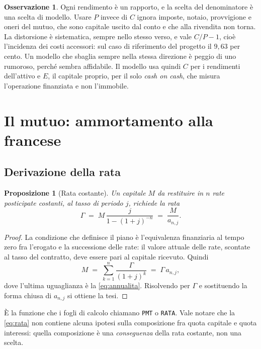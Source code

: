 \documentclass[11pt,a4paper]{article}
\theoremstyle{definition}
\newtheorem{osservazione}[definizione]{Osservazione}
\theoremstyle{plain}
\newtheorem{proposizione}[definizione]{Proposizione}
\begin{document}
\begin{osservazione}
Ogni rendimento è un rapporto, e la scelta del denominatore è una scelta di modello. Usare $P$ invece di $C$ ignora imposte, notaio, provvigione e oneri del mutuo, che sono capitale uscito dal conto e che alla rivendita non torna. La distorsione è sistematica, sempre nello stesso verso, e vale $C/P - 1$, cioè l'incidenza dei costi accessori: sul caso di riferimento del progetto il $9{,}63$ per cento. Un modello che sbaglia sempre nella stessa direzione è peggio di uno rumoroso, perché sembra affidabile. Il modello usa quindi $C$ per i rendimenti dell'attivo e $E$, il capitale proprio, per il solo \emph{cash on cash}, che misura l'operazione finanziata e non l'immobile.
\end{osservazione}

\section{Il mutuo: ammortamento alla francese}

\subsection{Derivazione della rata}

\begin{proposizione}[Rata costante]
Un capitale $M$ da restituire in $n$ rate posticipate costanti, al tasso di periodo $j$, richiede la rata
\begin{equation}
\Gamma \;=\; M\,\frac{j}{1-(1+j)^{-n}} \;=\; \frac{M}{a_{n,j}} .
\label{eq:rata}
\end{equation}
\end{proposizione}

\begin{proof}
La condizione che definisce il piano è l'equivalenza finanziaria al tempo zero fra l'erogato e la successione delle rate: il valore attuale delle rate, scontate al tasso del contratto, deve essere pari al capitale ricevuto. Quindi
\[
M \;=\; \sum_{k=1}^{n} \frac{\Gamma}{(1+j)^k} \;=\; \Gamma\,a_{n,j},
\]
dove l'ultima uguaglianza è la \eqref{eq:annualita}. Risolvendo per $\Gamma$ e sostituendo la forma chiusa di $a_{n,j}$ si ottiene la tesi.
\end{proof}

È la funzione che i fogli di calcolo chiamano \texttt{PMT} o \texttt{RATA}. Vale notare che la \eqref{eq:rata} non contiene alcuna ipotesi sulla composizione fra quota capitale e quota interessi: quella composizione è una \emph{conseguenza} della rata costante, non una scelta.
\end{document}

